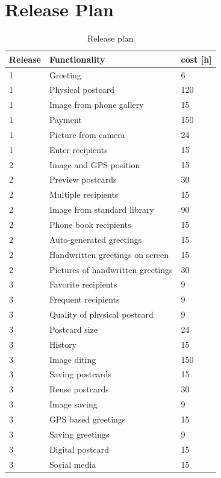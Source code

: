 \documentclass[10pt,a4paper]{article}
\begin{document}
\section{Release Plan}

\begin{table}[h!]
\centering
\label{table:release}
\begin{tabular}{| l | l | l | } \hline
\textbf{Release} & \textbf{Functionality} & \textbf{cost [h]} \\ \hline
1 & Greeting & 6\\ \hline
1 & Physical postcard & 120\\ \hline
1 & Image from phone gallery & 15\\ \hline
1 & Payment & 150\\ \hline
1 & Picture from camera & 24\\ \hline
1 & Enter recipients & 15\\ \hline
2 & Image and GPS position & 15\\ \hline
2 & Preview postcards & 30\\ \hline
2 & Multiple recipients & 15\\ \hline
2 & Image from standard library & 90\\ \hline
2 & Phone book recipients & 15\\ \hline
2 & Auto-generated greetings & 15\\ \hline
2 & Handwritten greetings on screen & 15\\ \hline
2 & Pictures of handwritten greetings & 30\\ \hline
3 &  Favorite recipients & 9\\ \hline
3 & Frequent recipients & 9\\ \hline
3 & Quality of physical postcard & 9\\ \hline
3 & Postcard size & 24\\ \hline
3 & History & 15\\ \hline
3 & Image diting & 150\\ \hline
3 & Saving postcards & 15\\ \hline
3 & Reuse postcards & 30\\ \hline
3 & Image saving & 9\\ \hline
3 & GPS based greetings &15\\ \hline
3 & Saving greetings & 9\\ \hline
3 & Digital postcard &15\\ \hline
3 & Social media &15\\ \hline
\end{tabular}\\
\caption{Release plan}
\end{table}
\end{document}
